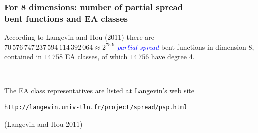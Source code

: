 \documentclass[pdf,sprung,slideColor,nocolorBG]{beamer}
\newenvironment{colortheme}[1]{
\def\ProvidesPackageRCS $##1${\relax}
\renewcommand{\ProcessOptions}{\relax}
\makeatletter

\makeatother
}{}
\newcommand{\slidecite}[1]{\tiny{(#1)}\normalsize{}}
\newcommand{\Emph}[1]{\emph{\textcolor{blue}{#1}}}
\begin{document}
\begin{colortheme}{jubata}
\begin{frame}
\begin{figure}
\begin{minipage}{.48\textwidth}
  \label{fig:cast128_7_21_bent_cayley_graph_index_matrix}
\end{minipage}%
\end{figure}
\end{frame}
\end{colortheme}

\begin{colortheme}{seagull}

\begin{frame}[fragile]
\frametitle{For 8 dimensions: number of partial spread \\ bent functions and EA classes}

According to Langevin and Hou (2011)
there are $70\,576\,747\,237\,594\,114\,392\,064 \approx 2^{75.9}$ \Emph{partial spread} bent functions in dimension 8,
contained in $14\,758$ EA classes, of which $14\,756$ have degree 4.

~

The EA class representatives are listed at Langevin's web site

\begin{verbatim}
http://langevin.univ-tln.fr/project/spread/psp.html
\end{verbatim}

\slidecite{Langevin and Hou 2011}
\end{frame}

\end{colortheme}
\end{document}
